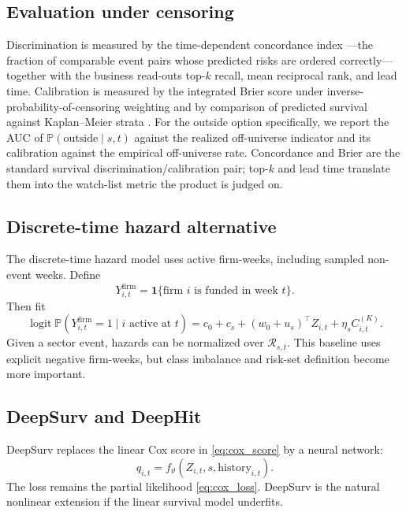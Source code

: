 \documentclass[11pt]{article}
\theoremstyle{plain}
\theoremstyle{definition}
\theoremstyle{remark}
\newcommand{\Prob}{\mathbb{P}}
\newcommand{\cR}{\mathcal{R}}
\newcommand{\one}{\mathbf{1}}
\DeclareMathOperator{\logit}{logit}
\begin{document}
\subsection{Evaluation under censoring}
\label{sec:eval}
Discrimination is measured by the time-dependent concordance index \citep{antolini2005}---the fraction of comparable event pairs whose predicted risks are ordered correctly---together with the business read-outs top-$k$ recall, mean reciprocal rank, and lead time. Calibration is measured by the integrated Brier score under inverse-probability-of-censoring weighting \citep{graf1999} and by comparison of predicted survival against Kaplan--Meier strata \citep{kaplan_meier1958}. For the outside option specifically, we report the AUC of $\Prob(\text{outside}\mid s,t)$ against the realized off-universe indicator and its calibration against the empirical off-universe rate. Concordance and Brier are the standard survival discrimination/calibration pair; top-$k$ and lead time translate them into the watch-list metric the product is judged on.

\subsection{Discrete-time hazard alternative}
The discrete-time hazard model uses active firm-weeks, including sampled non-event weeks. Define
\begin{equation}
Y^{\mathrm{firm}}_{i,t}=\one\{\text{firm }i\text{ is funded in week }t\}.
\end{equation}
Then fit
\begin{equation}
\logit\Prob(Y^{\mathrm{firm}}_{i,t}=1\mid i\text{ active at }t)
=c_0+c_s+(w_0+u_s)^\top Z_{i,t}+\eta_s C^{(K)}_{i,t}.
\label{eq:discrete_hazard}
\end{equation}
Given a sector event, hazards can be normalized over $\cR_{s,t}$. This baseline uses explicit negative firm-weeks, but class imbalance and risk-set definition become more important.

\subsection{DeepSurv and DeepHit}
DeepSurv replaces the linear Cox score in \eqref{eq:cox_score} by a neural network:
\begin{equation}
q_{i,t}=f_\vartheta(Z_{i,t},s,\text{history}_{i,t}).
\end{equation}
The loss remains the partial likelihood \eqref{eq:cox_loss}. DeepSurv is the natural nonlinear extension if the linear survival model underfits.
\end{document}
